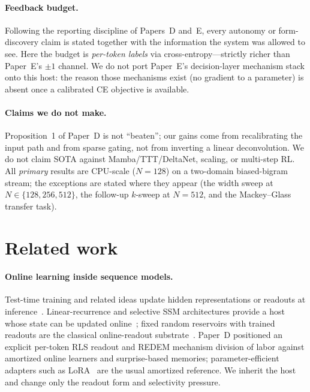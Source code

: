 \documentclass[preprint,12pt]{elsarticle}
\begin{document}
\paragraph{Feedback budget.}
Following the reporting discipline of Papers~D and~E, every autonomy
or form-discovery claim is stated together with the information the
system was allowed to see. Here the budget is \emph{per-token labels}
via cross-entropy---strictly richer than Paper~E's $\pm1$ channel. We
do not port Paper~E's decision-layer mechanism stack onto this host:
the reason those mechanisms exist (no gradient to a parameter) is
absent once a calibrated CE objective is available.

\paragraph{Claims we do not make.}
Proposition~1 of Paper~D is not ``beaten''; our gains come from
recalibrating the input path and from sparse gating, not from
inverting a linear deconvolution. We do not claim SOTA against
Mamba/TTT/DeltaNet, scaling, or multi-step RL. All \emph{primary}
results are CPU-scale ($N=128$) on a two-domain biased-bigram stream;
the exceptions are stated where they appear (the width sweep at
$N\in\{128,256,512\}$, the follow-up $k$-sweep at $N=512$, and the
Mackey--Glass transfer task).

\section{Related work}
\label{sec:related}

\paragraph{Online learning inside sequence models.}
Test-time training and related ideas update hidden representations or
readouts at inference~\cite{sun2024ttt}. Linear-recurrence and
selective SSM architectures provide a host whose state can be updated
online~\cite{sun2024ttt,gu2023mamba,gu2022s4}; fixed random reservoirs
with trained readouts are the classical online-readout
substrate~\cite{jaeger2001,lukosevicius2009}.
Paper~D positioned an explicit
per-token RLS readout and REDEM mechanism division of labor against
amortized online learners and surprise-based memories; parameter-efficient
adapters such as LoRA~\cite{hu2022lora} are the usual amortized reference.
We inherit the host and change only the readout form and selectivity
pressure.
\end{document}
